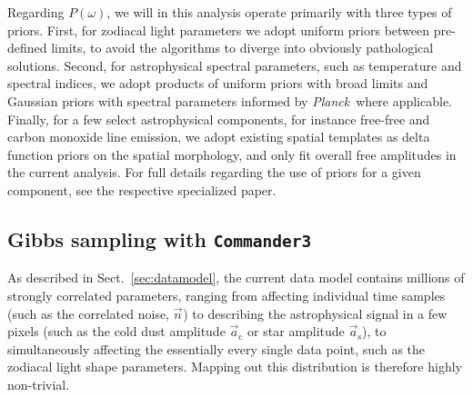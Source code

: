\documentclass{aa}
\def\commanderthree{\texttt{Commander3}}
\def\Planck{\textit{Planck}}
\newcommand{\n}[0]{\vec{n}}
\renewcommand{\a}[0]{\vec{a}}
\begin{document}
Regarding $P(\omega)$, we will in this analysis operate primarily with
three types of priors. First, for zodiacal light parameters we adopt
uniform priors between pre-defined limits, to avoid the algorithms to
diverge into obviously pathological solutions. Second, for
astrophysical spectral parameters, such as temperature and spectral
indices, we adopt products of uniform priors with broad limits and
Gaussian priors with spectral parameters informed by \Planck\ where
applicable. Finally, for a few select astrophysical components, for
instance free-free and carbon monoxide line emission, we adopt
existing spatial templates as delta function priors on the spatial
morphology, and only fit overall free amplitudes in the current
analysis. For full details regarding the use of priors for a given
component, see the respective specialized paper.

\subsection{Gibbs sampling with \commanderthree}

As described in Sect.~\ref{sec:datamodel}, the current data model
contains millions of strongly correlated parameters, ranging from
affecting individual time samples (such as the correlated noise,
$\n_{\mathrm{}}$) to describing the astrophysical signal in a few
pixels (such as the cold dust amplitude $\a_{\mathrm{c}}$ or star
amplitude $\a_{\mathrm{s}}$), to simultaneously affecting the
essentially every single data point, such as the zodiacal light shape
parameters. Mapping out this distribution is therefore highly
non-trivial.
\end{document}
